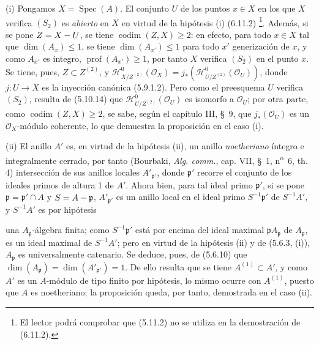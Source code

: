 (i) Pongamos $X=\operatorname{Spec}(A)$. El conjunto $U$ de los puntos
$x\in X$ en los que $X$ verifica $(S_2)$ es \emph{abierto} en $X$ en virtud de la
hipótesis (i) (6.11.2)
\footnote{El lector podrá comprobar que (5.11.2) no se utiliza en la
demostración de (6.11.2).}. Además, si se pone $Z=X- U$, se tiene
$\operatorname{codim}(Z,X)\geq2$: en efecto, para todo $x\in X$ tal que
$\dim(A_x)\leq1$, se tiene $\dim(A_{x'})\leq1$ para todo $x'$ generización de
$x$, y como $A_{x'}$ es íntegro, $\operatorname{prof}(A_{x'})\geq1$, por tanto
$X$ verifica $(S_2)$ en el punto $x$. Se tiene, pues, $Z\subset Z^{(2)}$, y
$\mathcal H^0_{X/Z^{(2)}}(\mathcal O_X)
=j_*(\mathcal H^0_{U/Z^{(2)}}(\mathcal O_U))$, donde $j:U\to X$ es la
inyección canónica (5.9.1.2). Pero como el preesquema $U$ verifica $(S_2)$,
resulta de (5.10.14) que
$\mathcal H^0_{U/Z^{(2)}}(\mathcal O_U)$ es isomorfo a $\mathcal O_U$; por
otra parte, como $\operatorname{codim}(Z,X)\geq2$, se sabe, según el capítulo
III, \S~9, que $j_*(\mathcal O_U)$ es un $\mathcal O_X$-módulo coherente, lo
que demuestra la proposición en el caso (i).

(ii) El anillo $A'$ es, en virtud de la hipótesis (ii), un anillo \emph{noetheriano}
íntegro e integralmente cerrado, por tanto (Bourbaki, \emph{Alg. comm.}, cap.
VII, \S~1, n\textsuperscript{o}~6, th. 4) intersección de sus anillos locales
$A'_{\mathfrak p'}$, donde $\mathfrak p'$ recorre el conjunto de los ideales
primos de altura 1 de $A'$. Ahora bien, para tal ideal primo $\mathfrak p'$,
si se pone $\mathfrak p=\mathfrak p'\cap A$ y $S=A-\mathfrak p$,
$A'_{\mathfrak p'}$ es un anillo local en el ideal primo
$S^{-1}\mathfrak p'$ de $S^{-1}A'$, y $S^{-1}A'$ es por hipótesis


una $A_\mathfrak p$-álgebra finita; como $S^{-1}\mathfrak p'$ está por encima
del ideal maximal $\mathfrak pA_\mathfrak p$ de $A_\mathfrak p$, es un ideal
maximal de $S^{-1}A'$; pero en virtud de la hipótesis (ii) y de (5.6.3, (i)),
$A_\mathfrak p$ es universalmente catenario. Se deduce, pues, de (5.6.10) que
$\dim(A_\mathfrak p)=\dim(A'_{\mathfrak p'})=1$. De ello resulta que se tiene
$A^{(1)}\subset A'$, y como $A'$ es un $A$-módulo de tipo finito por hipótesis,
lo mismo ocurre con $A^{(1)}$, puesto que $A$ es noetheriano; la proposición
queda, por tanto, demostrada en el caso (ii).


